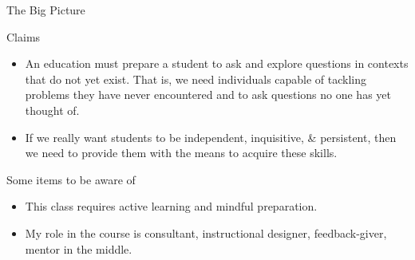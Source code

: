 \documentclass[10pt]{beamer}
\begin{document}
\begin{frame}{The Big Picture}

\vspace{2em}

\begin{block}{Claims}
\vspace{-.75em}
\begin{itemize}
\item An education must prepare a student to ask and explore questions in contexts that do not yet exist. That is, we need individuals capable of tackling problems they have never encountered and to ask questions no one has yet thought of.
\item If we really want students to be independent, inquisitive, \& persistent, then we need to provide them with the means to acquire these skills.
\end{itemize}
\end{block}

\pause

\begin{block}{Some items to be aware of}
\vspace{-.75em}
\begin{itemize}
\item This class requires \alert{active learning} and \alert{mindful preparation}. 
\item My role in the course is \alert{consultant}, \alert{instructional designer}, \alert{feedback-giver}, \alert{mentor in the middle}. 
\end{itemize}
\end{block}


\end{frame}
\end{document}
